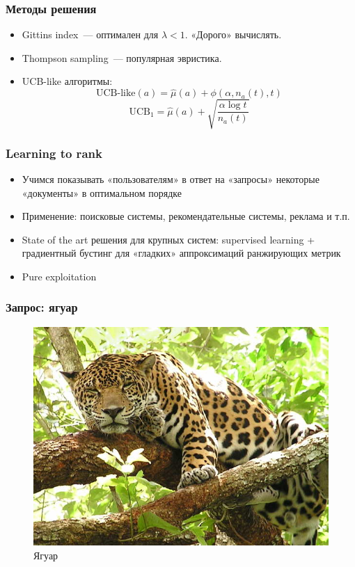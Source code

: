 \documentclass[xetex,mathserif,serif,table]{beamer}
\begin{document}
 

\begin{frame}
\frametitle{Методы решения}
\begin{itemize}
\item Gittins index —  оптимален для $\lambda < 1$. «Дорого» вычислять.
\item Thompson sampling — популярная эвристика. 
\item UCB-like алгоритмы:
$$\text{UCB-like}(a) = \hat{\mu}(a) + \phi(\alpha, n_a(t), t)$$ 
$$\text{UCB}_1 = \hat{\mu}(a) + \sqrt{\frac{\alpha \log t}{n_a(t)}}$$
\end{itemize}
\end{frame}

\begin{frame}
\frametitle{Learning to rank}
\begin{itemize}
\item Учимся показывать «пользователям» в ответ на «запросы»  некоторые «документы» в оптимальном порядке
\item Применение: поисковые системы, рекомендательные системы, реклама и т.п.
\item State of the art решения для крупных систем: supervised learning + градиентный бустинг для «гладких» аппроксимаций ранжирующих метрик
\item Pure exploitation
\end{itemize}
\end{frame}



\begin{frame}
\frametitle{Запрос: ягуар}

\begin{figure}
  \centering
     \includegraphics[width=0.7\paperwidth]{img/jaguar1.jpg}
    \caption{Ягуар}
\end{figure}

\end{frame}
\end{document}
